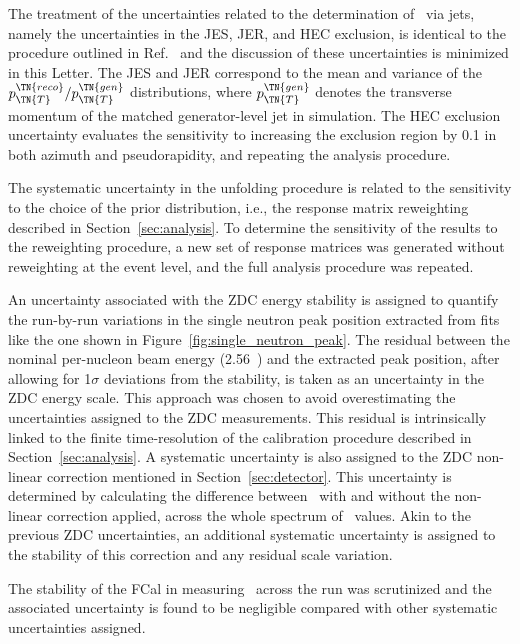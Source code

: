 \documentclass[PAPER, atlasdraft=false, USenglish, cernpreprint]{atlasdoc}
\begin{document}
The treatment of the uncertainties related to the determination of \xp\ via jets, namely the uncertainties in the JES, JER, and HEC exclusion, is identical to the procedure outlined in Ref.~\cite{ATLAS:2023zfx} and the discussion of these uncertainties is minimized in this Letter.
The JES and JER correspond to the mean and variance of the $p_{\TN{T}}^\TN{reco}/p_{\TN{T}}^\TN{gen}$ distributions, where $p_{\TN{T}}^\TN{gen}$ denotes the transverse momentum of the matched generator-level jet in simulation. 
The HEC exclusion uncertainty evaluates the sensitivity to increasing the exclusion region by 0.1 in both azimuth and pseudorapidity, and repeating the analysis procedure.








The systematic uncertainty in the unfolding procedure is related to the sensitivity to the choice of the prior distribution, i.e., the response matrix reweighting described in Section~\ref{sec:analysis}. 
To determine the sensitivity of the results to the reweighting procedure, a new set of response matrices was generated without reweighting at the event level, and the full analysis procedure was repeated. 



An uncertainty associated with the ZDC energy stability is assigned to quantify the run-by-run variations in the single neutron peak position extracted from fits like the one shown in Figure~\ref{fig:single_neutron_peak}.  
The residual between the nominal per-nucleon beam energy (2.56~\TeV) and the extracted peak position, after allowing for 1$\sigma$ deviations from the stability, is taken as an uncertainty in the ZDC energy scale. 
This approach was chosen to avoid overestimating the uncertainties assigned to the ZDC measurements. This residual is intrinsically linked to the finite time-resolution of the calibration procedure described in Section~\ref{sec:analysis}.
A systematic uncertainty is also assigned to the ZDC non-linear correction mentioned in Section~\ref{sec:detector}. This uncertainty is determined by calculating the difference between \EZDC\ with and without the non-linear correction applied, across the whole spectrum of \EZDC\ values.  Akin to the previous ZDC uncertainties, an additional systematic uncertainty is assigned to the stability of this correction and any residual scale variation.  




The stability of the FCal in measuring \ETPB\ across the run was scrutinized and the associated uncertainty is found to be negligible compared with other systematic uncertainties assigned. 
\end{document}

